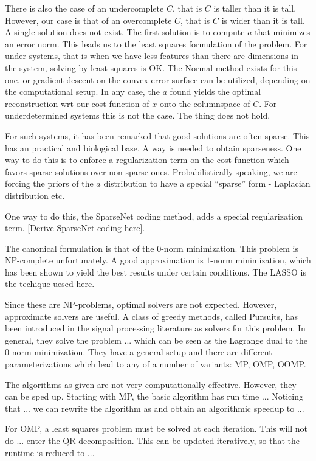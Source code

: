 \documentclass[12pt,a4paper,oneside,english]{UPBThesis}
\begin{document}
There is also the case of an undercomplete $C$, that is $C$ is taller than it is tall. However, our case is that of an overcomplete $C$, that is $C$ is wider than it is tall. A single solution does not exist. The first solution is to compute $a$ that minimizes an error norm. This leads us to the least squares formulation of the problem. For under systems, that is when we have less features than there are dimensions in the system, solving by least squares is OK. The Normal method exists for this one, or gradient descent on the convex error surface can be utilized, depending on the computational setup. In any case, the $a$ found yields the optimal reconstruction wrt our cost function of $x$ onto the columnspace of $C$. For underdetermined systems this is not the case. The thing does not hold.

For such systems, it has been remarked that good solutions are often sparse. This has an practical and biological base. A way is needed to obtain sparseness. One way to do this is to enforce a regularization term on the cost function which favors sparse solutions over non-sparse ones. Probabilistically speaking, we are forcing the priors of the $a$ distribution to have a special ``sparse'' form - Laplacian distribution etc.

One way to do this, the SparseNet coding method, adds a special regularization term. [Derive SparseNet coding here].

The canonical formulation is that of the $0$-norm minimization. This problem is NP-complete unfortunately. A good approximation is $1$-norm minimization, which has been shown to yield the best results under certain conditions. The LASSO is the techique uesed here.

Since these are NP-problems, optimal solvers are not expected. However, approximate solvers are useful. A class of greedy methods, called Pursuits, has been introduced in the signal processing literature as solvers for this problem. In general, they solve the problem ... which can be seen as the Lagrange dual to the $0$-norm minimization. They have a general setup and there are different parameterizations which lead to any of a number of variants: MP, OMP, OOMP.

The algorithms as given are not very computationally effective. However, they can be sped up. Starting with MP, the basic algorithm has run time ... Noticing that ... we can rewrite the algorithm as and obtain an algorithmic speedup to ...

For OMP, a least squares problem must be solved at each iteration. This will not do ... enter the QR decomposition. This can be updated iteratively, so that the runtime is reduced to ...
\end{document}
